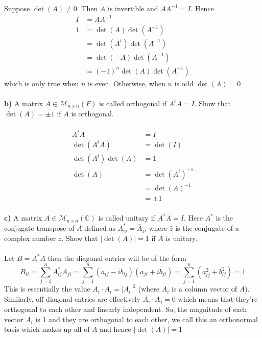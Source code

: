 \documentclass[11pt]{amsart}
\theoremstyle{definition}  %
\newcommand{\C}{\mathbb{C}}
\begin{document}
\\
Suppose $\det(A) \ne 0$.  Then $A$ is invertible and $AA^{-1}=I$.  Hence 
\begin{align*}
	I &= AA^{-1}\\
	1&= \det(A)\det(A^{-1})\\
	&=\det(A^t)\det(A^{-1})\\
	&= \det(-A)\det(A^{-1}) \\
	&= (-1)^n\det(A)\det(A^{-1})
\end{align*}which is only true when $n$ is even.  Otherwise, when $n$ is odd $\det(A) = 0$\\
\\
{\bf b)}  A matrix $A \in \mathcal{M}_{n \times n}(F)$ is called orthogonal if $A^tA = I$. Show that $\det(A) = \pm 1$ if $A$ is orthogonal. \\
\\
\begin{align*}
	A^tA &= I \\
	\det(A^tA) &= \det(I)\\
	\det(A^t)\det(A) &= 1 \\
	\det(A) &= \det(A^t)^{-1} \\
	&= \det(A)^{-1} \\
	&= \pm 1
\end{align*}
\\
{\bf c)}  A matrix $A \in \mathcal{M}_{n \times n}(\C)$ is called unitary if $A^*A = I$. Here $A^*$ is the conjugate transpose of $A$ defined as $A_{ij}^* = \bar{A}_{ji}$ where 
$\bar{z}$ is the conjugate of a complex number $z$.  Show that $|\det(A)| = 1$ if $A$ is unitary. \\
\\
Let $B=A^*A$ then the diagonal entries will be of the form $$B_{ii}= \sum_{j=1}^n A^*_{ij}A_{ji}=\sum_{j=1}^n (a_{ij}-ib_{ij})(a_{ji}+ib_{ji})=\sum_{j=1}^n (a_{ij}^2+b_{ij}^2)=1$$  This is essentially the value $A_i\cdot A_i=|A_i| ^2$ (where $A_i$ is a column vector of $A$).  Similarly, off diagonal entries are effectively $A_i\cdot A_j = 0$ which means that they're orthogonal to each other and linearly independent.  So, the magnitude of each vector $A_i$ is 1 and they are orthogonal to each other, we call this an orthonormal basis which makes up all of $A$ and hence $|\det(A)|=1$
\\
\end{document}
